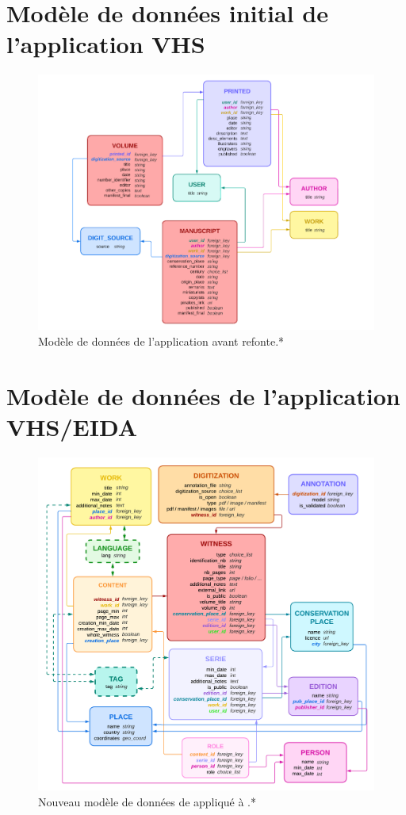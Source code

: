 \section{Modèle de données initial de l'application VHS}
	\begin{figure}[H]
		\centering
		\includegraphics[width=16cm]{figues/vhs_data_model.png}
		\caption{Modèle de données de l'application \vhs avant refonte.*}
		\label{fig:vhs_data_model}
	\end{figure}

\section{Modèle de données de l'application VHS/EIDA}
	\begin{figure}[H]
		\centering
		\includegraphics[width=16cm]{figues/new_model.png}
		\caption{Nouveau modèle de données de \eida appliqué à \vhs.*}
		\label{fig:eida_data_model}
	\end{figure}


